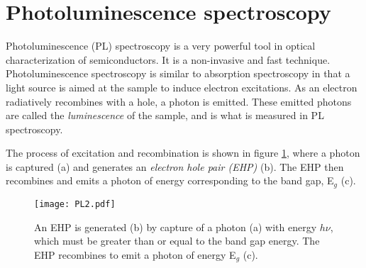 			
			
		

	
\section{Photoluminescence spectroscopy}
\label{sec:pl}
Photoluminescence (PL) spectroscopy is a very powerful tool in optical characterization of semiconductors. It is a non-invasive and fast technique. Photoluminescence spectroscopy is similar to absorption spectroscopy in that a light source is aimed at the sample to induce electron excitations. As an electron radiatively recombines with a hole, a photon is emitted. These emitted photons are called the \emph{luminescence} of the sample, and is what is measured in PL spectroscopy. 




The process of excitation and recombination is shown in figure \ref{fig:pl2}, where a photon is captured (a) and generates an \emph{electron hole pair (EHP)} (b). The EHP then recombines and emits a photon of energy corresponding to the band gap, E$_g$ (c). 

\begin{figure}[h]
\begin{center}
\texttt{[image: PL2.pdf]}
\caption{An EHP is generated (b) by capture of a photon (a) with energy $h\nu$, which must be greater than or equal to the band gap energy. The EHP recombines to emit a photon of energy E$_g$ (c).
\label{fig:pl2}}
\end{center}
\end{figure}

